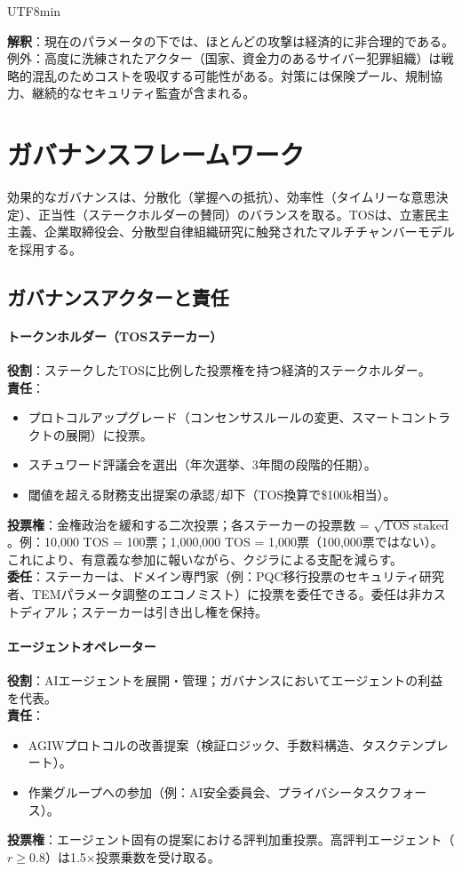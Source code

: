 \documentclass[11pt]{article}
\begin{document}
\begin{CJK}{UTF8}{min}
\begin{itemize}[noitemsep]
\textbf{解釈}：現在のパラメータの下では、ほとんどの攻撃は経済的に非合理的である。例外：高度に洗練されたアクター（国家、資金力のあるサイバー犯罪組織）は戦略的混乱のためコストを吸収する可能性がある。対策には保険プール、規制協力、継続的なセキュリティ監査が含まれる。

\section{ガバナンスフレームワーク}
\label{sec:governance}

効果的なガバナンスは、分散化（掌握への抵抗）、効率性（タイムリーな意思決定）、正当性（ステークホルダーの賛同）のバランスを取る。TOSは、立憲民主主義、企業取締役会、分散型自律組織研究に触発されたマルチチャンバーモデルを採用する。

\subsection{ガバナンスアクターと責任}

\paragraph{トークンホルダー（TOSステーカー）}
\textbf{役割}：ステークしたTOSに比例した投票権を持つ経済的ステークホルダー。\\
\textbf{責任}：
\begin{itemize}[noitemsep]
  \item プロトコルアップグレード（コンセンサスルールの変更、スマートコントラクトの展開）に投票。
  \item スチュワード評議会を選出（年次選挙、3年間の段階的任期）。
  \item 閾値を超える財務支出提案の承認/却下（TOS換算で\$100k相当）。
\end{itemize}
\textbf{投票権}：金権政治を緩和する二次投票；各ステーカーの投票数 = $\sqrt{\text{TOS staked}}$。例：10,000 TOS = 100票；1,000,000 TOS = 1,000票（100,000票ではない）。これにより、有意義な参加に報いながら、クジラによる支配を減らす。\\
\textbf{委任}：ステーカーは、ドメイン専門家（例：PQC移行投票のセキュリティ研究者、TEMパラメータ調整のエコノミスト）に投票を委任できる。委任は非カストディアル；ステーカーは引き出し権を保持。

\paragraph{エージェントオペレーター}
\textbf{役割}：AIエージェントを展開・管理；ガバナンスにおいてエージェントの利益を代表。\\
\textbf{責任}：
\begin{itemize}[noitemsep]
  \item AGIWプロトコルの改善提案（検証ロジック、手数料構造、タスクテンプレート）。
  \item 作業グループへの参加（例：AI安全委員会、プライバシータスクフォース）。
\end{itemize}
\textbf{投票権}：エージェント固有の提案における評判加重投票。高評判エージェント（$r \geq 0.8$）は1.5$\times$投票乗数を受け取る。


\end{itemize}
\end{CJK}
\end{document}
